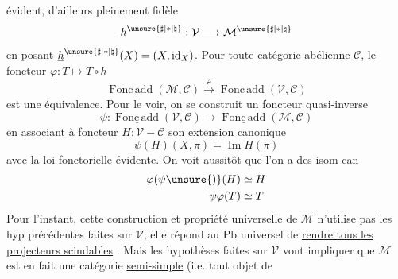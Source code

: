 
évident, d'ailleurs pleinement fidèle
\[
\underline h^{\unsure{\sharp|*|\natural}}:\mathcal V\longrightarrow\mathcal M^{\unsure{\sharp|*|\natural}}
\]
en posant \(\underline h^{\unsure{\sharp|*|\natural}}(X)=(X,\operatorname{id}_X)\).
Pour toute catégorie
abélienne \(\mathcal C\), le foncteur \(\varphi:T\longmapsto T\circ h\)
\[
\underline{\operatorname{Fonc\,add}}(\mathcal M,\mathcal C)
\xrightarrow{\varphi}
\underline{\operatorname{Fonc\,add}}(\mathcal V,\mathcal C)
\]
est une  équivalence. Pour le voir, on
se construit un foncteur quasi-inverse
\[
\psi:\underline{\operatorname{Fonc\,add}}(\mathcal V,\mathcal C)
\longrightarrow
\underline{\operatorname{Fonc\,add}}(\mathcal M,\mathcal C)
\]
en associant à  foncteur 
\(H:\mathcal V\mathbin{-}\mathcal C\)
son extension canonique
\[
\psi(H)(X,\pi)=\operatorname{Im}H(\pi)
\]
avec la loi fonctorielle évidente. On voit
aussitôt que l'on a des isom can
\[
\begin{aligned}
\varphi(\psi\unsure{)}(H)&\simeq H\\
\psi\varphi(T)&\simeq T
\end{aligned}
\]
Pour l'instant, cette construction et propriété
universelle de \(\mathcal M\) n'utilise pas les hyp
précédentes faites sur \(\mathcal V\); elle répond au Pb
universel de \uline{rendre tous les projecteurs
scindables} .
Mais les hypothèses faites
sur \(\mathcal V\) vont impliquer que \(\mathcal M\) est en
fait une catégorie  \uline{semi-simple}
(i.e. tout objet de

